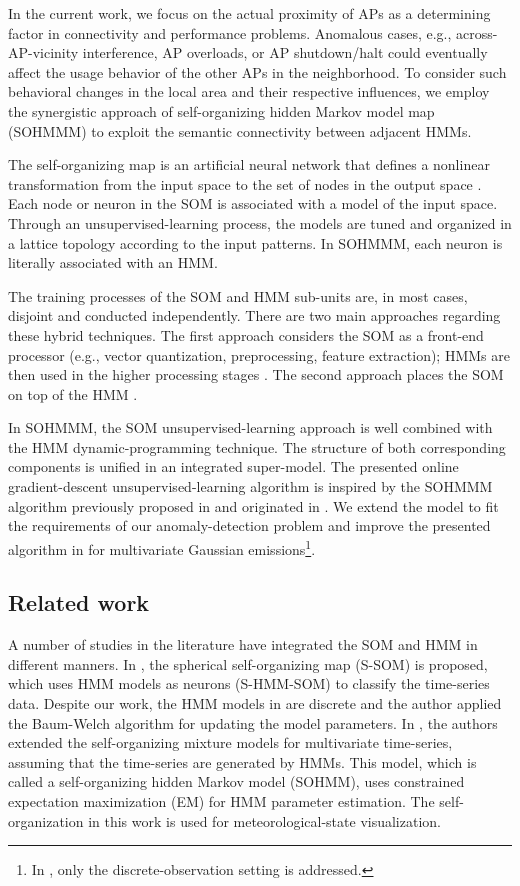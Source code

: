 In the current work, we focus on the actual proximity of APs as a determining factor in connectivity and performance problems. Anomalous cases, e.g., across-AP-vicinity interference, AP overloads, or AP shutdown/halt could eventually affect the usage behavior of the other APs in the neighborhood. To consider such behavioral changes in the local area and their respective influences, we employ the synergistic approach of self-organizing hidden Markov model map (SOHMMM) to exploit the semantic connectivity between adjacent HMMs.

The self-organizing map is an artificial neural network that defines a nonlinear transformation from the input space to the set of nodes in the output space \cite{Ref8}. Each node or neuron in the SOM is associated with a model of the input space. Through an unsupervised-learning process, the models are tuned and organized in a lattice topology according to the input patterns. In SOHMMM, each neuron is literally associated with an HMM.  

The training processes of the SOM and HMM sub-units are, in most cases, disjoint and conducted independently. There are two main approaches regarding these hybrid techniques. The first approach considers the SOM as a front-end processor (e.g., vector quantization, preprocessing, feature extraction); HMMs are then used in the higher processing stages \cite{Ref8,Ref9,Ref41}. The second approach places the SOM on top of the HMM \cite{Ref1,Ref11,Ref39}.   

In SOHMMM, the SOM unsupervised-learning approach is well combined with the HMM dynamic-programming technique. The structure of both corresponding components is unified in an integrated super-model. The presented online gradient-descent unsupervised-learning algorithm is inspired by the SOHMMM algorithm previously proposed in \cite{Ref1} and originated in \cite{Ref3}. We extend the model to fit the requirements of our anomaly-detection problem and improve the presented algorithm in \cite{Ref1} for multivariate Gaussian emissions\footnote{In \cite{Ref1}, only the discrete-observation setting is addressed.}.

\subsection{Related work}
A number of studies in the literature have integrated the SOM and HMM in different manners. In \citet{Gen2012}, the spherical self-organizing map (S-SOM) is proposed, which uses HMM models as neurons (S-HMM-SOM) to classify the time-series data. Despite our work, the HMM models in \citet{Gen2012} are discrete and the author applied the  Baum-Welch algorithm for updating the model parameters. In \citet{Yamaguchi2010}, the authors extended the self-organizing mixture models for multivariate time-series, assuming that the time-series are generated by HMMs. This model, which is called a self-organizing hidden Markov model (SOHMM), uses constrained expectation maximization (EM) for HMM parameter estimation. The self-organization in this work is used for meteorological-state visualization. 


